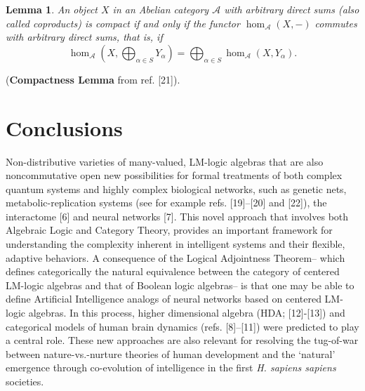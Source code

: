 \documentclass[12pt]{article}
\theoremstyle{plain}
\newtheorem{lemma}{Lemma}[section]
\theoremstyle{definition}
\numberwithin{equation}{section}
\begin{document}
\begin{lemma}
An object $X$ in an Abelian category  $\mathcal{A}$ with arbitrary direct sums (also called \emph{coproducts}) is compact if and only if the functor $\hom_{\mathcal{A}}(X,-)$ commutes with arbitrary direct sums, that is, if
\begin{equation}
\hom_{\mathcal{A}}(X,\bigoplus_{\alpha \in S} Y_{\alpha}) =
\bigoplus_{\alpha \in S} \hom_{\mathcal{A}}(X,Y_{\alpha}).
\end{equation}
\end{lemma}
(\textbf{Compactness Lemma}  from ref. [21]).
\bigbreak

\section{Conclusions}

Non-distributive varieties of many-valued, LM-logic algebras that are also noncommutative open new possibilities for formal treatments of both complex quantum systems and highly complex biological networks, such as genetic nets, metabolic-replication systems (see for example refs. [19]--[20] and [22]), the interactome [6] and neural networks [7]. This novel approach that involves both Algebraic Logic and Category Theory, provides an important framework for understanding the complexity inherent in intelligent systems and their flexible, adaptive behaviors. A consequence of the Logical Adjointness Theorem-- which defines categorically the natural equivalence between the category of centered LM-logic algebras and that of Boolean logic algebras-- is that one may be able to define Artificial Intelligence analogs of neural networks based on centered LM-logic algebras. In this process, higher dimensional algebra (HDA; [12]-[13]) and categorical models of human brain dynamics (refs. [8]--[11]) were predicted to play a central role. These new approaches are also relevant for resolving the tug-of-war between nature-vs.-nurture theories of human development and the `natural' emergence through co-evolution of intelligence in the first \emph{H. sapiens sapiens} societies.

%
%
\end{document}
